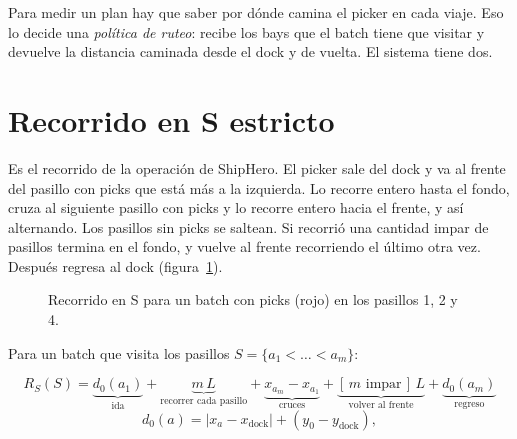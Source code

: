 \documentclass[11pt,a4paper,oneside]{report}
\newcommand{\RS}{R_S}
\begin{document}
Para medir un plan hay que saber por dónde camina el picker en cada viaje. Eso lo decide una
\emph{política de ruteo}: recibe los bays que el batch tiene que visitar y devuelve la
distancia caminada desde el dock y de vuelta. El sistema tiene dos.

\section{Recorrido en S estricto}
\label{sec:sshape}

Es el recorrido de la operación de ShipHero. El picker sale del dock y va al frente del
pasillo con picks que está más a la izquierda. Lo recorre entero hasta el fondo, cruza al
siguiente pasillo con picks y lo recorre entero hacia el frente, y así alternando. Los
pasillos sin picks se saltean. Si recorrió una cantidad impar de pasillos termina en el
fondo, y vuelve al frente recorriendo el último otra vez. Después regresa al dock
(figura~\ref{fig:sshape}).

\begin{figure}[ht]
\centering
{}
\caption{Recorrido en S para un batch con picks (rojo) en los pasillos 1, 2 y 4.}
\label{fig:sshape}
\end{figure}

Para un batch que visita los pasillos $S = \{a_1 < \dots < a_m\}$:

\begin{equation}
\RS(S) = \underbrace{d_0(a_1)}_{\text{ida}} + \underbrace{m\,L}_{\text{recorrer cada pasillo}}
+ \underbrace{x_{a_m} - x_{a_1}}_{\text{cruces}}
+ \underbrace{[\,m \text{ impar}\,]\,L}_{\text{volver al frente}} + \underbrace{d_0(a_m)}_{\text{regreso}}
\label{eq:rs}
\end{equation}
\[
d_0(a) = |x_a - x_{\text{dock}}| + (y_0 - y_{\text{dock}}),
\]
\end{document}
